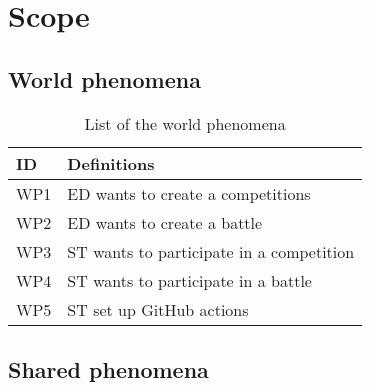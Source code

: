 \section{Scope}
\label{s:Scope}%

\subsection{World phenomena}
\label{ss:world_phenomena}%

\begin{table}[H]
  \begin{tabular}{|l|l|}

    \hline
    \textbf{ID} & \textbf{Definitions}      \\
    \hline
    WP1 & ED wants to create a competitions \\
    \hline
    WP2 & ED wants to create a battle \\
    \hline
    WP3 & ST wants to participate in a competition \\
    \hline
    WP4 & ST wants to participate in a battle     \\
    \hline
    WP5 & ST set up GitHub actions    \\
    \hline
  \end{tabular}
  \caption{List of the world phenomena}
  \label{tab:worldPhenomena}
\end{table}

\subsection{Shared phenomena}
\label{ss:shared_phenomena}%

